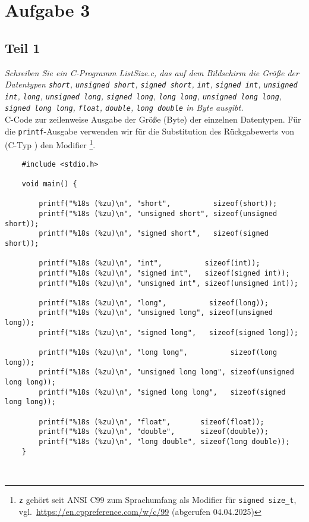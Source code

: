 \chapter{Aufgabe 3}


\section{Teil 1}
\textit{Schreiben Sie ein C-Programm ListSize.c, das auf dem Bildschirm die
        Größe der Datentypen
\texttt{short},
\texttt{unsigned short},
\texttt{signed short},
\texttt{int},
\texttt{signed int},
\texttt{unsigned int},
\texttt{long},
\texttt{unsigned long},
\texttt{signed long},
\texttt{long long},
\texttt{unsigned long long},
\texttt{signed long long},
\texttt{float},
\texttt{double},
\texttt{long double}
in Byte ausgibt.}\\


\noindent
C-Code zur zeilenweise Ausgabe der Größe (Byte) der einzelnen Datentypen.
Für die \texttt{printf}-Ausgabe verwenden wir für die Substitution des Rückgabewerts von  (C-Typ ) den Modifier \footnote{\texttt{z} gehört seit ANSI C99 zum Sprachumfang als Modifier für \texttt{signed size\_t}, vgl.~\url{https://en.cppreference.com/w/c/99} (abgerufen 04.04.2025)
}.

\begin{verbatim}
    #include <stdio.h>

    void main() {

        printf("%18s (%zu)\n", "short",          sizeof(short));
        printf("%18s (%zu)\n", "unsigned short", sizeof(unsigned short));
        printf("%18s (%zu)\n", "signed short",   sizeof(signed short));

        printf("%18s (%zu)\n", "int",          sizeof(int));
        printf("%18s (%zu)\n", "signed int",   sizeof(signed int));
        printf("%18s (%zu)\n", "unsigned int", sizeof(unsigned int));

        printf("%18s (%zu)\n", "long",          sizeof(long));
        printf("%18s (%zu)\n", "unsigned long", sizeof(unsigned long));
        printf("%18s (%zu)\n", "signed long",   sizeof(signed long));

        printf("%18s (%zu)\n", "long long",          sizeof(long long));
        printf("%18s (%zu)\n", "unsigned long long", sizeof(unsigned long long));
        printf("%18s (%zu)\n", "signed long long",   sizeof(signed long long));

        printf("%18s (%zu)\n", "float",       sizeof(float));
        printf("%18s (%zu)\n", "double",      sizeof(double));
        printf("%18s (%zu)\n", "long double", sizeof(long double));
    }
\end{verbatim}\\



